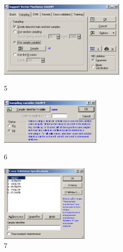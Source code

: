 \begin{figure}[!h]
  \centering

  \begin{minipage}{0.32\textwidth}
    \centering

    \includegraphics[height=3.8cm]
    {inc/ex_5.PNG}

    \caption{5}

    \label{fig:5}
  \end{minipage}
  \begin{minipage}{0.42\textwidth}
    \centering

    \includegraphics[width=5cm]
    {inc/ex_6.PNG}

    \caption{6}

    \label{fig:6}
  \end{minipage}
  \begin{minipage}{0.22\textwidth}
    \centering

    \includegraphics[height=3.8cm]
    {inc/ex_7.PNG}

    \caption{7}

    \label{fig:7}
  \end{minipage}
\end{figure}

